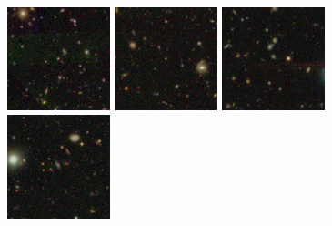 \begin{figure}
\begin{center}
\includegraphics[angle=0,width=3.0cm]{figures/thumbnails/SN2007rl.png}
\includegraphics[angle=0,width=3.0cm]{figures/thumbnails/SN2007rm.png}
\includegraphics[angle=0,width=3.0cm]{figures/thumbnails/SN2007rq.png}
\includegraphics[angle=0,width=3.0cm]{figures/thumbnails/SN2007se.png}
\end{center}
\end{figure}
